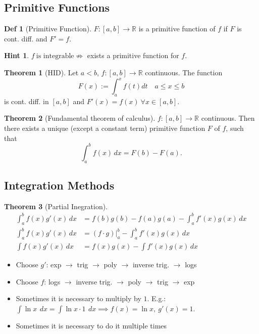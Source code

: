 \documentclass[a4paper, 10pt]{article}
\theoremstyle{definition}
\newtheorem*{definition}{Def}
\newtheorem*{note_wrapper}{Hint}
\theoremstyle{ex}
\theoremstyle{named}
\newtheorem*{ntheorem_wrapper}{Theorem}
\newenvironment{ntheorem}%
    {\begin{mdframed}[style=important]\begin{ntheorem_wrapper}}%
    {\end{ntheorem_wrapper}\end{mdframed}}
\newenvironment{note}%
    {\begin{mdframed}[style=trick]\begin{note_wrapper}}%
    {\end{note_wrapper}\end{mdframed}}
\newcommand{\R}{\mathbb{R}}
\begin{document}
\subsection{Primitive Functions}
\begin{definition}[Primitive Function]
    $F: [a, b] \to \R$ is a primitive function of $f$ if $F$ is cont. diff. and $F' = f$.
\end{definition}

\begin{note}
    $f \ \text{is integrable} \not\Rightarrow$ exists a primitive function for $f$.
\end{note}

\begin{ntheorem}[HID]
    Let $a < b$, $f: [a, b] \to \R$ continuous. The function 
    $$F(x) := \int_a^x f(t) dt \quad a \leq x \leq b$$
    is cont. diff. in $[a, b]$ and $F'(x) = f(x) \ \forall x \in [a, b]$.
\end{ntheorem}

\begin{ntheorem}[Fundamental theorem of calculus]
    $f: [a, b] \to \R$ continuous. Then there exists a unique (except a constant term) primitive function $F$ of $f$, such that 
    $$\int_a^b f(x) \,dx = F(b) - F(a).$$
\end{ntheorem}

\pagebreak
\subsection{Integration Methods}
\begin{ntheorem}[Partial Inegration]
    \begin{align*}
        \int_a^b f(x) g'(x) \,dx &= f(b)g(b) - f(a)g(a) - \int_a^b f'(x)g(x) \,dx \\
        \int_a^b f(x) g'(x) \,dx &= (f \cdot g)|_a^b - \int_a^b f'(x)g(x) \,dx \\
        \int f(x)g'(x) \,dx &= f(x) g(x) - \int f'(x) g(x) \,dx
    \end{align*}
\end{ntheorem}
\begin{itemize}
    \item Choose $g'$: exp $\rightarrow$ trig $\rightarrow$ poly $\rightarrow$ inverse trig. $\rightarrow$ logs
    \item Choose $f$: logs $\rightarrow$ inverse trig. $\rightarrow$ poly $\rightarrow$ trig $\rightarrow$ exp
    \item Sometimes it is necessary to multiply by $1$. E.g.: $\int \ln x \ \,dx = \int \ln x \cdot 1 \ \,dx \implies f(x) = \ln x, \ g'(x) = 1$.
    \item Sometimes it is necessary to do it multiple times
\end{itemize}
\end{document}
